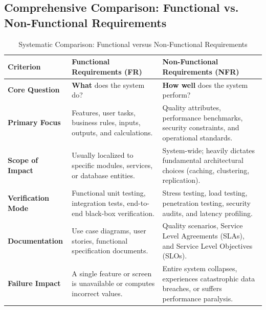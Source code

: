 \subsection{Comprehensive Comparison: Functional vs. Non-Functional Requirements}
\begin{table}[htbp]
\centering
\small
\caption{Systematic Comparison: Functional versus Non-Functional Requirements}
\label{tab:fr_vs_nfr}
\begin{tabularx}{\textwidth}{l p{5cm} X}
\toprule
\textbf{Criterion} & \textbf{Functional Requirements (FR)} & \textbf{Non-Functional Requirements (NFR)} \\
\midrule
\textbf{Core Question} & \textbf{What} does the system do? & \textbf{How well} does the system perform? \\
\textbf{Primary Focus} & Features, user tasks, business rules, inputs, outputs, and calculations. & Quality attributes, performance benchmarks, security constraints, and operational standards. \\
\textbf{Scope of Impact} & Usually localized to specific modules, services, or database entities. & System-wide; heavily dictates fundamental architectural choices (caching, clustering, replication). \\
\textbf{Verification Mode} & Functional unit testing, integration tests, end-to-end black-box verification. & Stress testing, load testing, penetration testing, security audits, and latency profiling. \\
\textbf{Documentation} & Use case diagrams, user stories, functional specification documents. & Quality scenarios, Service Level Agreements (SLAs), and Service Level Objectives (SLOs). \\
\textbf{Failure Impact} & A single feature or screen is unavailable or computes incorrect values. & Entire system collapses, experiences catastrophic data breaches, or suffers performance paralysis. \\
\bottomrule
\end{tabularx}
\end{table}

